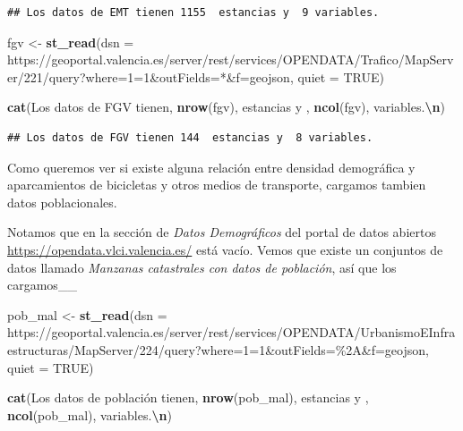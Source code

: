 \documentclass[notspecified,article,submit,moreauthors,pdftex]{Definitions/mdpi}
\newenvironment{Shaded}{\begin{snugshade}}{\end{snugshade}}
\newcommand{\AttributeTok}[1]{\textcolor[rgb]{0.13,0.29,0.53}{#1}}
\newcommand{\ConstantTok}[1]{\textcolor[rgb]{0.56,0.35,0.01}{#1}}
\newcommand{\FunctionTok}[1]{\textcolor[rgb]{0.13,0.29,0.53}{\textbf{#1}}}
\newcommand{\NormalTok}[1]{#1}
\newcommand{\OtherTok}[1]{\textcolor[rgb]{0.56,0.35,0.01}{#1}}
\newcommand{\SpecialCharTok}[1]{\textcolor[rgb]{0.81,0.36,0.00}{\textbf{#1}}}
\newcommand{\StringTok}[1]{\textcolor[rgb]{0.31,0.60,0.02}{#1}}
\begin{document}
\begin{verbatim}
## Los datos de EMT tienen 1155  estancias y  9 variables.
\end{verbatim}

\begin{Shaded}
\begin{Highlighting}[]
\NormalTok{fgv }\OtherTok{\textless{}{-}} \FunctionTok{st\_read}\NormalTok{(}\AttributeTok{dsn =} \StringTok{\textquotesingle{}https://geoportal.valencia.es/server/rest/services/OPENDATA/Trafico/MapServer/221/query?where=1=1\&outFields=*\&f=geojson\textquotesingle{}}\NormalTok{, }\AttributeTok{quiet =} \ConstantTok{TRUE}\NormalTok{)}

\FunctionTok{cat}\NormalTok{(}\StringTok{\textquotesingle{}Los datos de FGV tienen\textquotesingle{}}\NormalTok{, }\FunctionTok{nrow}\NormalTok{(fgv), }\StringTok{\textquotesingle{} estancias y \textquotesingle{}}\NormalTok{, }\FunctionTok{ncol}\NormalTok{(fgv), }\StringTok{\textquotesingle{}variables.}\SpecialCharTok{\textbackslash{}n}\StringTok{\textquotesingle{}}\NormalTok{)}
\end{Highlighting}
\end{Shaded}

\begin{verbatim}
## Los datos de FGV tienen 144  estancias y  8 variables.
\end{verbatim}

Como queremos ver si existe alguna relación entre densidad demográfica y
aparcamientos de bicicletas y otros medios de transporte, cargamos
tambien datos poblacionales.

Notamos que en la sección de \emph{Datos Demográficos} del portal de
datos abiertos \url{https://opendata.vlci.valencia.es/} está vacío.
Vemos que existe un conjuntos de datos llamado \emph{Manzanas
catastrales con datos de población}, así que los cargamos\_\_

\begin{Shaded}
\begin{Highlighting}[]
\NormalTok{pob\_mal }\OtherTok{\textless{}{-}} \FunctionTok{st\_read}\NormalTok{(}\AttributeTok{dsn =} \StringTok{\textquotesingle{}https://geoportal.valencia.es/server/rest/services/OPENDATA/UrbanismoEInfraestructuras/MapServer/224/query?where=1=1\&outFields=\%2A\&f=geojson\textquotesingle{}}\NormalTok{, }\AttributeTok{quiet =} \ConstantTok{TRUE}\NormalTok{)}

\FunctionTok{cat}\NormalTok{(}\StringTok{\textquotesingle{}Los datos de población tienen\textquotesingle{}}\NormalTok{, }\FunctionTok{nrow}\NormalTok{(pob\_mal), }\StringTok{\textquotesingle{} estancias y \textquotesingle{}}\NormalTok{, }\FunctionTok{ncol}\NormalTok{(pob\_mal), }\StringTok{\textquotesingle{}variables.}\SpecialCharTok{\textbackslash{}n}\StringTok{\textquotesingle{}}\NormalTok{)}
\end{Highlighting}
\end{Shaded}
\end{document}
